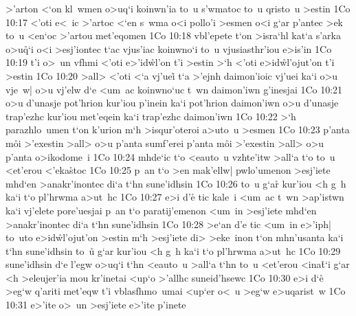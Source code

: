 >'arton
<`on
kl~wmen
o>uq`i
koinwn'ia
to~u
s'wmatoc
to~u
qristo~u
>estin\bibvsend
\vs 1Co 10:17
<'oti
e<~ic
>'artoc
<`en
s~wma
o<i
pollo'i
>esmen
o<i
g`ar
p'antec
>ek
to~u
<en`oc
>'artou
met'eqomen\bibvsend
\vs 1Co 10:18
vbl'epete
t`on
>isra`hl
kat`a
s'arka
o>u\r{q}`i
o<i
>esj'iontec
t`ac
vjus'iac
koinwno`i
to~u
vjusiasthr'iou
e>is'in\bibvsend
\vs 1Co 10:19
t'i
o>~un
vfhmi
<'oti
e>'id\r{w}l'on
t'i
>estin
>`h
<'oti
e>id\r{w}l'ojut'on
t'i
>estin\bibvsend
\vs 1Co 10:20
>all>
<'oti
<`a
vj'uei\r{}
t`a
>'ejnh
daimon'ioic
vj'uei
ka`i
o>u
vje~w|
o>u
vj'elw
d`e
<um~ac
koinwno`uc
t~wn
daimon'iwn
g'inesjai\bibvsend
\vs 1Co 10:21
o>u
d'unasje
pot'hrion
kur'iou
p'inein
ka`i
pot'hrion
daimon'iwn
o>u
d'unasje
trap'ezhc
kur'iou
met'eqein
ka`i
trap'ezhc
daimon'iwn\bibvsend
\vs 1Co 10:22
>`h
parazhlo~umen
t`on
k'urion
m`h
>isqur'oteroi
a>uto~u
>esmen\bibvsend
\vs 1Co 10:23
p'anta
m\r{o}i
>'exestin
>all>
o>u
p'anta
sumf'erei
p'anta
m\r{o}i
>'exestin
>all>
o>u
p'anta
o>ikodome~i\bibvsend
\vs 1Co 10:24
mhde`ic
t`o
<eauto~u
vzhte'itw
>all`a
t`o
to~u
<et'erou
<'eka\r{s}toc\bibvsend
{}
\vs 1Co 10:25
p~an
t`o
>en
mak'ellw|
pwlo'umenon
>esj'iete
mhd`en
>anakr'inontec
di`a
t`hn
sune'idhsin\bibvsend
\vs 1Co 10:26
to~u
g`ar\r{}
kur'iou
<h
g~h
ka`i
t`o
pl'hrwma
a>ut~hc\bibvsend
\vs 1Co 10:27
e>i
d'e\r{}
tic
kale~i
<um~ac
t~wn
>ap'istwn
ka`i
vj'elete
pore'uesjai
p~an
t`o
paratij'emenon
<um~in
>esj'iete
mhd`en
>anakr'inontec
di`a
t`hn
sune'idhsin\bibvsend
\vs 1Co 10:28
>e`an
d'e
tic
<um~in
e>'iph|
to~uto
e>id\r{w}l'ojut'on
>estin
m`h
>esj'iete
di>
>eke~inon
t`on
mhn'usanta
ka`i
t`hn
sune'idhsin
to~u\r{}
g`ar
kur'iou
<h
g~h
ka`i
t`o
pl'hrwma
a>ut~hc\bibvsend
\vs 1Co 10:29
sune'idhsin
d`e
l'egw
o>uq`i
t`hn
<eauto~u
>all`a
t`hn
to~u
<et'erou
<ina\r{t}`i
g`ar
<h
>eleujer'ia
mou
kr'inetai
<up`o
>'allhc
suneid'hsewc\bibvsend
\vs 1Co 10:30
e>i
d`e\r{}
>eg`w
q'ariti
met'eqw
t'i
vblasfhmo~umai
<up`er
o<~u
>eg`w
e>uqarist~w\bibvsend
\vs 1Co 10:31
e>'ite
o>~un
>esj'iete
e>'ite
p'inete
